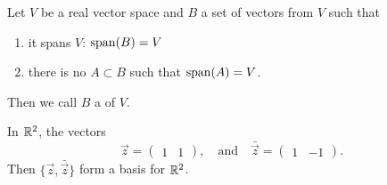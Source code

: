 \begin{definition}
Let $V$ be a real vector space and $B$ a set of vectors from $V$ such
that
\begin{enumerate}
\item it spans $V$: $\operatorname{span}(B)=V$
\item there is no $A\subset B$ such that $\operatorname{span}(A)=V$.
\end{enumerate}
Then we call $B$ a  of $V$.
\end{definition}

\begin{example}
  In $\mathbb{R}^{2}$, the vectors
  \begin{equation}
\vec{z} = \begin{pmatrix}1 & 1
\end{pmatrix},\quad\mbox{and}\quad\bar{\vec{z}} = \begin{pmatrix}1 & -1
\end{pmatrix}.
  \end{equation}
  Then $\{\vec{z}, \bar{\vec{z}}\}$ form a basis for $\mathbb{R}^{2}$.
\end{example}
